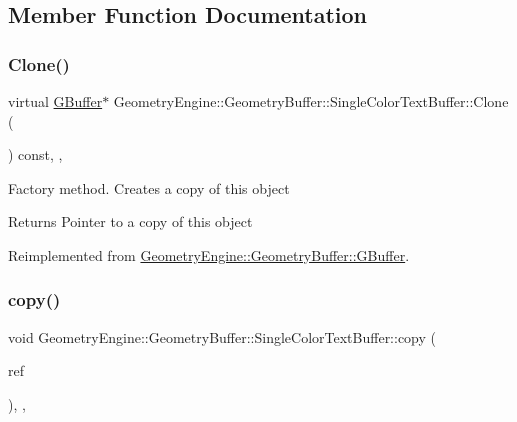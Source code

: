\subsection{Member Function Documentation}
\mbox{\label{class_geometry_engine_1_1_geometry_buffer_1_1_single_color_text_buffer_add00c2857f9d425600ef83d50a9c8019}} 
\subsubsection{\texorpdfstring{Clone()}{Clone()}}
{\footnotesize\ttfamily virtual \mbox{\hyperlink{class_geometry_engine_1_1_geometry_buffer_1_1_g_buffer}{G\+Buffer}}$\ast$ Geometry\+Engine\+::\+Geometry\+Buffer\+::\+Single\+Color\+Text\+Buffer\+::\+Clone (\begin{DoxyParamCaption}{ }\end{DoxyParamCaption}) const\hspace{0.3cm}{\ttfamily [inline]}, {\ttfamily [override]}, {\ttfamily [virtual]}}

Factory method. Creates a copy of this object \begin{DoxyReturn}{Returns}
Pointer to a copy of this object 
\end{DoxyReturn}


Reimplemented from \mbox{\hyperlink{class_geometry_engine_1_1_geometry_buffer_1_1_g_buffer_af993f8c23f7e78051f3071be4873af9d}{Geometry\+Engine\+::\+Geometry\+Buffer\+::\+G\+Buffer}}.

\mbox{\label{class_geometry_engine_1_1_geometry_buffer_1_1_single_color_text_buffer_a6e266272638dd67cec7b6d57f172eae2}} 
\subsubsection{\texorpdfstring{copy()}{copy()}}
{\footnotesize\ttfamily void Geometry\+Engine\+::\+Geometry\+Buffer\+::\+Single\+Color\+Text\+Buffer\+::copy (\begin{DoxyParamCaption}\item[{const \mbox{\hyperlink{class_geometry_engine_1_1_geometry_buffer_1_1_g_buffer}{G\+Buffer}} \&}]{ref }\end{DoxyParamCaption})\hspace{0.3cm}{\ttfamily [override]}, {\ttfamily [protected]}, {\ttfamily [virtual]}}

